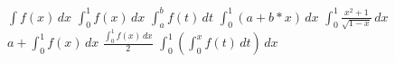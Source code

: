 \documentclass{article}
\begin{document}
$\int f(x)\,dx$
$\int_0^1 f(x)\,dx$
$\int_a^b f(t)\,dt$
$\int_0^1 (a+b*x)\,dx$
$\int_0^1 \frac{x^2+1}{\sqrt{1-x}}\,dx$
$a+\int_0^1 f(x)\,dx$
$\frac{\int_0^1 f(x)\,dx}{2}$
$\int_0^1 \left(\int_0^x f(t)\,dt\right)\,dx$
\end{document}

